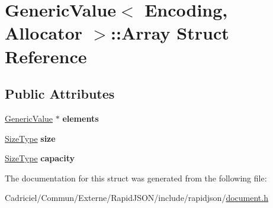 \hypertarget{struct_generic_value_1_1_array}{}\section{Generic\+Value$<$ Encoding, Allocator $>$\+:\+:Array Struct Reference}
\label{struct_generic_value_1_1_array}
\subsection*{Public Attributes}
\begin{DoxyCompactItemize}
\item 
\hyperlink{class_generic_value}{Generic\+Value} $\ast$ {\bfseries elements}\hypertarget{struct_generic_value_1_1_array_a0af8e50f37486f042ab19fd871d11d4f}{}\label{struct_generic_value_1_1_array_a0af8e50f37486f042ab19fd871d11d4f}

\item 
\hyperlink{rapidjson_8h_a5ed6e6e67250fadbd041127e6386dcb5}{Size\+Type} {\bfseries size}\hypertarget{struct_generic_value_1_1_array_a60f69b3b57b86c20c123c1b080e34bcc}{}\label{struct_generic_value_1_1_array_a60f69b3b57b86c20c123c1b080e34bcc}

\item 
\hyperlink{rapidjson_8h_a5ed6e6e67250fadbd041127e6386dcb5}{Size\+Type} {\bfseries capacity}\hypertarget{struct_generic_value_1_1_array_a2f5dfb089ee750e9405d5adeda4df894}{}\label{struct_generic_value_1_1_array_a2f5dfb089ee750e9405d5adeda4df894}

\end{DoxyCompactItemize}


The documentation for this struct was generated from the following file\+:\begin{DoxyCompactItemize}
\item 
Cadriciel/\+Commun/\+Externe/\+Rapid\+J\+S\+O\+N/include/rapidjson/\hyperlink{document_8h}{document.\+h}\end{DoxyCompactItemize}
